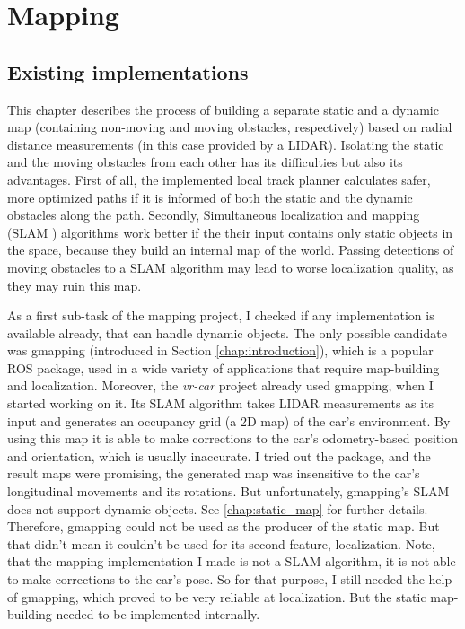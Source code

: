 \chapter{Mapping}
\label{chap:mapping}

\section{Existing implementations}
This chapter describes the process of building a separate static and a dynamic map (containing non-moving and moving obstacles, respectively) based on radial distance measurements (in this case provided by a LIDAR). Isolating the static and the moving obstacles from each other has its difficulties but also its advantages. First of all, the implemented local track planner calculates safer, more optimized paths if it is informed of both the static and the dynamic obstacles along the path. Secondly, Simultaneous localization and mapping (SLAM \cite{wiki_slam}) algorithms work better if the their input contains only static objects in the space, because they build an internal map of the world. Passing detections of moving obstacles to a SLAM algorithm may lead to worse localization quality, as they may ruin this map.

As a first sub-task of the mapping project, I checked if any implementation is available already, that can handle dynamic objects. The only possible candidate was gmapping \cite{ros_gmapping} (introduced in Section \ref{chap:introduction}), which is a popular ROS package, used in a wide variety of applications that require map-building and localization. Moreover, the \textit{vr-car} project already used gmapping, when I started working on it. Its SLAM algorithm takes LIDAR measurements as its input and generates an occupancy grid (a 2D map) of the car's environment. By using this map it is able to make corrections to the car's odometry-based position and orientation, which is usually inaccurate. I tried out the package, and the result maps were promising, the generated map was insensitive to the car's longitudinal movements and its rotations. But unfortunately, gmapping's SLAM does not support dynamic objects. See \ref{chap:static_map} for further details. Therefore, gmapping could not be used as the producer of the static map. But that didn't mean it couldn't be used for its second feature, localization. Note, that the mapping implementation I made is not a SLAM algorithm, it is not able to make corrections to the car's pose. So for that purpose, I still needed the help of gmapping, which proved to be very reliable at localization. But the static map-building needed to be implemented internally.

